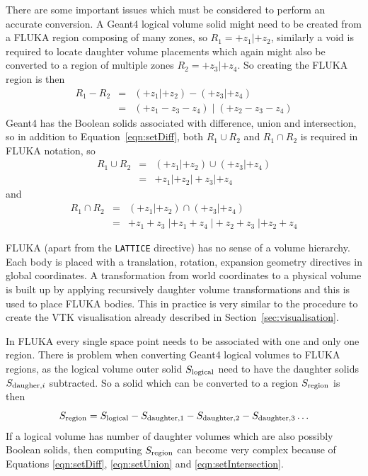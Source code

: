 \documentclass[final,5p,times,twocolumn]{elsarticle}
\newcommand{\fluka}[1]{\texttt{\MakeUppercase{#1}}}
\begin{document}
There are some important issues which must be considered to perform an accurate conversion. 
A Geant4 logical volume solid might need to be created from a FLUKA region composing of many zones, 
so $R_1 = +z_1 | +z_2$, similarly a void is required to locate daughter volume placements which again 
might also be converted to a region of multiple zones $R_2= +z_3 | +z_4$. So creating the FLUKA region is then 
\begin{eqnarray}
R_1 - R_2 	& = & (+z_1 | +z_2) - ( +z_3 | +z_4) 			\\
			& = & (+z_1 - z_3 - z_4) \;  | \; (+z_2 - z_3 - z_4)	
\label{eqn:setDiff}
\end{eqnarray}
Geant4 has the Boolean solids associated with difference, union and intersection, so in addition to 
Equation~\ref{eqn:setDiff}, both $R_1 \cup R_2$ and $R_1 \cap R_2$ is required in FLUKA notation, so 
\begin{eqnarray}
R_1 \cup R_2 	& = & (+z_1 | +z_2)  \cup ( +z_3 | +z_4) \\
			& = & +z_1 | +z_2 |  +z_3 | +z_4
\label{eqn:setUnion}
\end{eqnarray}
and 
\begin{eqnarray}
R_1 \cap R_2 	& = & (+z_1 | +z_2) \cap ( +z_3 | +z_4) \\
			& = & +z_1 +z_3  \; | +z_1 +z_4 \; | +z_2 +z_3 \; | +z_2 +z_4
\label{eqn:setIntersection}
\end{eqnarray}

FLUKA (apart from the \fluka{lattice} directive) has no sense of a volume hierarchy. Each body is placed with a 
translation, rotation, expansion geometry directives in global coordinates. A transformation from world 
coordinates to a physical volume is built up by applying recursively daughter volume transformations 
and  this is used to place FLUKA bodies. This  in practice is very similar to the procedure to create the 
VTK visualisation already described in Section~\ref{sec:visualisation}.

In FLUKA every single space point needs to be associated with one and only one region. There is problem 
when converting Geant4 logical volumes to FLUKA regions, as the logical volume outer solid $S_{\rm logical}$ 
need to have the daughter  solids $S_{{\rm daugher},i}$ subtracted. So a solid which can be converted 
to a region $S_{\rm region}$ is then 
\begin{equation}
S_{\rm region} =  S_{\rm logical} - S_{\rm daughter,1} - S_{\rm daughter,2} - S_{\rm daughter,3} \ldots 
\label{eqn:logicalSubtraction}
\end{equation} 
If a logical volume has  number of daughter volumes which are also possibly Boolean solids, then computing 
$S_{\rm region}$ can become very complex because of Equations \ref{eqn:setDiff}, \ref{eqn:setUnion} and 
\ref{eqn:setIntersection}. 
\end{document}
